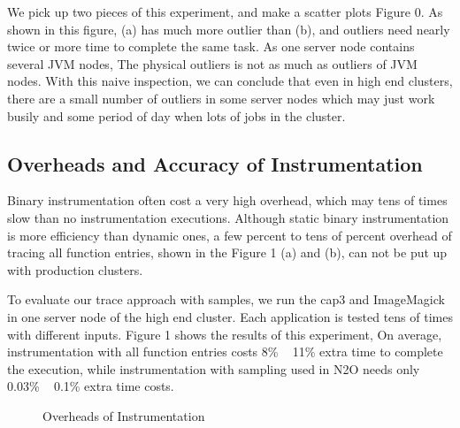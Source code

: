 We pick up two pieces of this experiment, and make a scatter plots Figure 0. As shown in this figure, (a) has much more outlier than (b), and outliers need nearly twice or more time to complete the same task. As one server node contains several JVM nodes, The physical outliers is not as much as outliers of JVM nodes. With this naive inspection, we can conclude that even in high end clusters, there are a small number of outliers in some server nodes which may just work busily and some period of day when lots of jobs in the cluster.

\subsection{Overheads and Accuracy of Instrumentation}

Binary instrumentation often cost a very high overhead, which may tens of  times slow than no instrumentation executions. Although static binary instrumentation is more efficiency than dynamic ones, a few percent to tens of percent overhead of tracing all function entries, shown in the Figure 1 (a) and (b), can not be put up with production clusters. 

To evaluate our trace approach with samples, we run the cap3 and ImageMagick in one server node of the high end cluster. Each application is tested tens of times with different inputs. Figure 1 shows the results of this experiment, On average, instrumentation with all function entries costs 8\% ~ 11\% extra time to complete the execution, while instrumentation with sampling used in N2O needs only 0.03\% ~ 0.1\% extra time costs.

\begin{figure}
\centering
{}
\caption{Overheads of Instrumentation}
\label{figure:overheads}
\end{figure}


